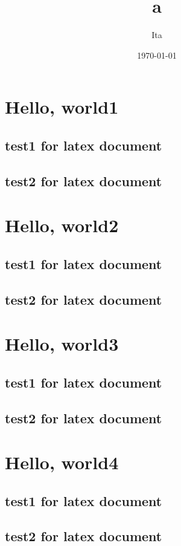 \documentclass[a4paper,12pt]{article}
\title{a}
\date{\today}
\author{Ita}
\begin{document}
\maketitle
\tableofcontents
\section{Hello, world1}
\subsection{test1 for latex document}
\subsection{test2 for latex document}
\section{Hello, world2}
\subsection{test1 for latex document}
\subsection{test2 for latex document}
\section{Hello, world3}
\subsection{test1 for latex document}
\subsection{test2 for latex document}
\section{Hello, world4}
\subsection{test1 for latex document}
\subsection{test2 for latex document}
\end{document}
